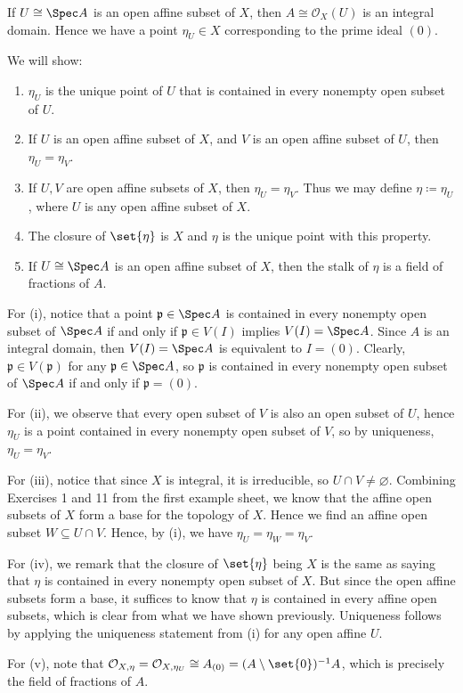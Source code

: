 If $U\cong \Spec A$ is an open affine subset of $X$, then $A \cong \mathcal{O}_X(U)$ is
an integral domain. Hence we have a point $\eta_U \in X$ corresponding to the prime ideal $(0)$.

We will show:
\begin{enumerate}[label=(\roman*)]
	\item $\eta_U$ is the unique point of $U$ that is contained in every nonempty open
		subset of $U$.
	\item If $U$ is an open affine subset of $X$, and $V$ is an open affine subset
		of $U$, then $\eta_U = \eta_V$.
	\item If $U, V$ are open affine subsets of $X$, then $\eta_U = \eta_V$. Thus
		we may define $\eta\coloneqq \eta_U$, where $U$ is any open affine subset
		of $X$.
	\item The closure of $\set{\eta}$ is $X$ and $\eta$ is the unique point with
		this property.
	\item If  $U\cong \Spec A$ is an open affine subset of $X$, then the stalk of $\eta$ is a
		field of fractions of $A$.
\end{enumerate}

For (i), notice that a point $\mathfrak{p} \in \Spec A$ is contained in every nonempty open
subset of $\Spec A$ if and only if $\mathfrak{p} \in V(I)$ implies $V(I) = \Spec A$.
Since $A$ is an integral domain, then $V(I) = \Spec A$ is equivalent to $I = (0)$.
Clearly, $\mathfrak{p} \in V(\mathfrak{p})$ for any $\mathfrak{p} \in \Spec A$,
so $\mathfrak{p}$ is contained in every nonempty open subset of $\Spec A$ if and only
if $\mathfrak{p} = (0)$.

For (ii), we observe that every open subset of $V$ is also an open subset of
$U$, hence $\eta_U$ is a point contained in every nonempty open subset of $V$,
so by uniqueness, $\eta_U = \eta_V$.

For (iii), notice that since $X$ is integral, it is irreducible, so $U\cap V \neq \varnothing$.
Combining Exercises 1 and 11 from the first example sheet, we know that the affine
open subsets of $X$ form a base for the topology of $X$. Hence we find an affine
open subset $W \subseteq U\cap V$.
Hence, by (i), we have $\eta_U = \eta_W = \eta_V$.

For (iv), we remark that the closure of $\set{\eta}$ being $X$ is the same as saying
that $\eta$ is contained in every nonempty open subset of $X$. But since the
open affine subsets form a base, it suffices to know that $\eta$ is contained
in every affine open subsets, which is clear from what we have shown previously.
Uniqueness follows by applying the uniqueness statement from (i) for any
open affine $U$.

For (v), note that $\mathcal{O}_{X, \eta} = \mathcal{O}_{X, \eta_U} \cong A_{(0)} = (A\setminus\set{0})^{-1}A$,
which is precisely the field of fractions of $A$.
